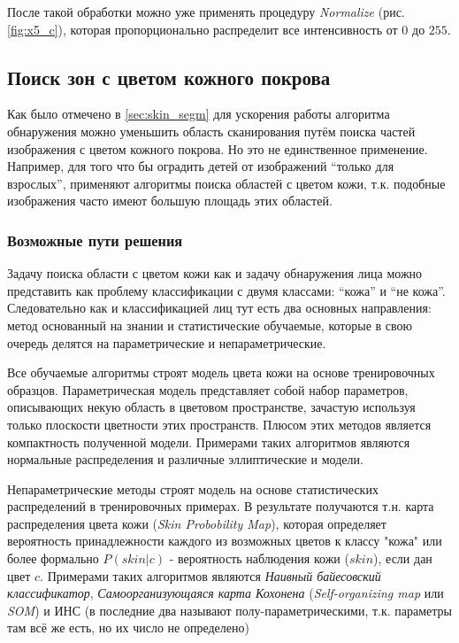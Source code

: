 \documentclass[12pt]{report}
\begin{document}
\begin{figure}[h]
	\centering
	\caption{}
	\label{fig:aggresive_normal_steps}
\end{figure}

После такой обработки можно уже применять процедуру \textit{Normalize} (рис. \ref{fig:x5_c}), которая 
пропорционально 
распределит все интенсивность от $0$ до $255$.

\subsection{Поиск зон с цветом кожного покрова}
\label{sec:skin_detection}
Как было отмечено в \ref{sec:skin_segm} для ускорения работы алгоритма обнаружения можно уменьшить область 
сканирования путём поиска частей изображения с цветом кожного покрова. Но это не единственное применение. Например, 
для того что бы оградить детей от изображений ``только для взрослых'', применяют алгоритмы поиска областей с цветом 
кожи, т.к. подобные изображения часто имеют большую площадь этих областей. \citep{forsyth1999automatic} \citep
{zheng2004blocking}

\subsubsection{Возможные пути решения}
Задачу поиска области с цветом кожи как и задачу обнаружения лица можно представить как проблему классификации с 
двумя классами: ``кожа'' и ``не кожа''. Следовательно как и классификацией лиц тут есть два основных направления: 
метод основанный на знании и статистические обучаемые, которые в свою очередь делятся на параметрические и 
непараметрические. \citep{vezhnevets2003survey}

Все обучаемые алгоритмы строят модель цвета кожи на основе тренировочных образцов. Параметрическая модель 
представляет собой набор параметров, описывающих некую область в цветовом пространстве, зачастую используя только 
плоскости цветности этих пространств. Плюсом этих методов является компактность полученной модели. Примерами таких 
алгоритмов являются нормальные распределения и различные эллиптические и модели.

Непараметрические методы строят модель на основе статистических распределений в тренировочных примерах. В 
результате 
получаются т.н. карта распределения цвета кожи (\textit{Skin Probobility Map}), которая определяет вероятность 
принадлежности каждого из возможных цветов к классу "кожа" или более формально $P(skin|c)$ - вероятность наблюдения 
кожи ($skin$), если дан цвет $c$. Примерами таких алгоритмов являются \emph{Наивный байесовский классификатор}, 
\emph
{Самоорганизующаяся карта Кохонена} (\textit{Self-organizing map} или \textit{SOM}) и ИНС (в \citep{xu2006color} 
последние два называют полу-параметрическими, т.к. параметры там всё же есть, но их число не определено)
\end{document}
